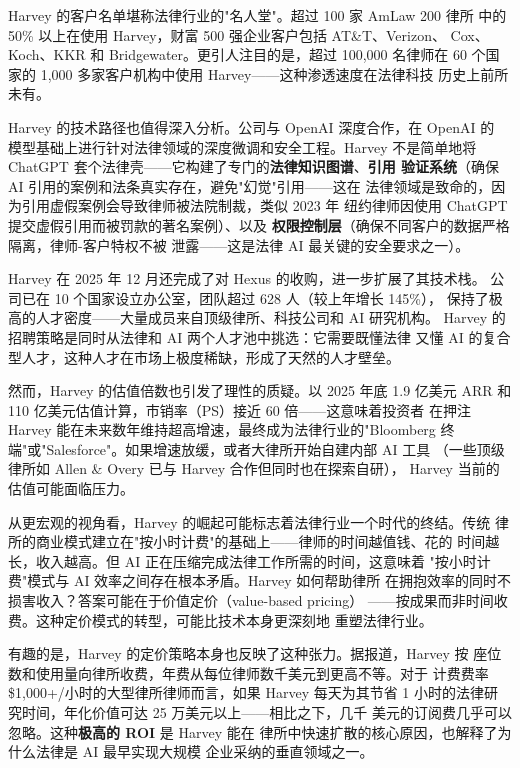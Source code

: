 Harvey 的客户名单堪称法律行业的"名人堂"。超过 100 家 AmLaw 200 律所
中的 50\% 以上在使用 Harvey，财富 500 强企业客户包括 AT\&T、Verizon、
Cox、Koch、KKR 和 Bridgewater。更引人注目的是，超过 100,000 名律师在
60 个国家的 1,000 多家客户机构中使用 Harvey——这种渗透速度在法律科技
历史上前所未有。

Harvey 的技术路径也值得深入分析。公司与 OpenAI 深度合作，在 OpenAI 的
模型基础上进行针对法律领域的深度微调和安全工程。Harvey 不是简单地将
ChatGPT 套个法律壳——它构建了专门的\textbf{法律知识图谱}、\textbf{引用
验证系统}（确保 AI 引用的案例和法条真实存在，避免"幻觉"引用——这在
法律领域是致命的，因为引用虚假案例会导致律师被法院制裁，类似 2023 年
纽约律师因使用 ChatGPT 提交虚假引用而被罚款的著名案例）、以及
\textbf{权限控制层}（确保不同客户的数据严格隔离，律师-客户特权不被
泄露——这是法律 AI 最关键的安全要求之一）。

Harvey 在 2025 年 12 月还完成了对 Hexus 的收购，进一步扩展了其技术栈。
公司已在 10 个国家设立办公室，团队超过 628 人（较上年增长 145\%），
保持了极高的人才密度——大量成员来自顶级律所、科技公司和 AI 研究机构。
Harvey 的招聘策略是同时从法律和 AI 两个人才池中挑选：它需要既懂法律
又懂 AI 的复合型人才，这种人才在市场上极度稀缺，形成了天然的人才壁垒。

然而，Harvey 的估值倍数也引发了理性的质疑。以 2025 年底 1.9 亿美元
ARR 和 110 亿美元估值计算，市销率（PS）接近 60 倍——这意味着投资者
在押注 Harvey 能在未来数年维持超高增速，最终成为法律行业的"Bloomberg
终端"或"Salesforce"。如果增速放缓，或者大律所开始自建内部 AI 工具
（一些顶级律所如 Allen \& Overy 已与 Harvey 合作但同时也在探索自研），
Harvey 当前的估值可能面临压力。

从更宏观的视角看，Harvey 的崛起可能标志着法律行业一个时代的终结。传统
律所的商业模式建立在"按小时计费"的基础上——律师的时间越值钱、花的
时间越长，收入越高。但 AI 正在压缩完成法律工作所需的时间，这意味着
"按小时计费"模式与 AI 效率之间存在根本矛盾。Harvey 如何帮助律所
在拥抱效率的同时不损害收入？答案可能在于价值定价（value-based pricing）
——按成果而非时间收费。这种定价模式的转型，可能比技术本身更深刻地
重塑法律行业。

有趣的是，Harvey 的定价策略本身也反映了这种张力。据报道，Harvey 按
座位数和使用量向律所收费，年费从每位律师数千美元到更高不等。对于
计费费率 \$1,000+/小时的大型律所律师而言，如果 Harvey 每天为其节省
1 小时的法律研究时间，年化价值可达 25 万美元以上——相比之下，几千
美元的订阅费几乎可以忽略。这种\textbf{极高的 ROI} 是 Harvey 能在
律所中快速扩散的核心原因，也解释了为什么法律是 AI 最早实现大规模
企业采纳的垂直领域之一。

